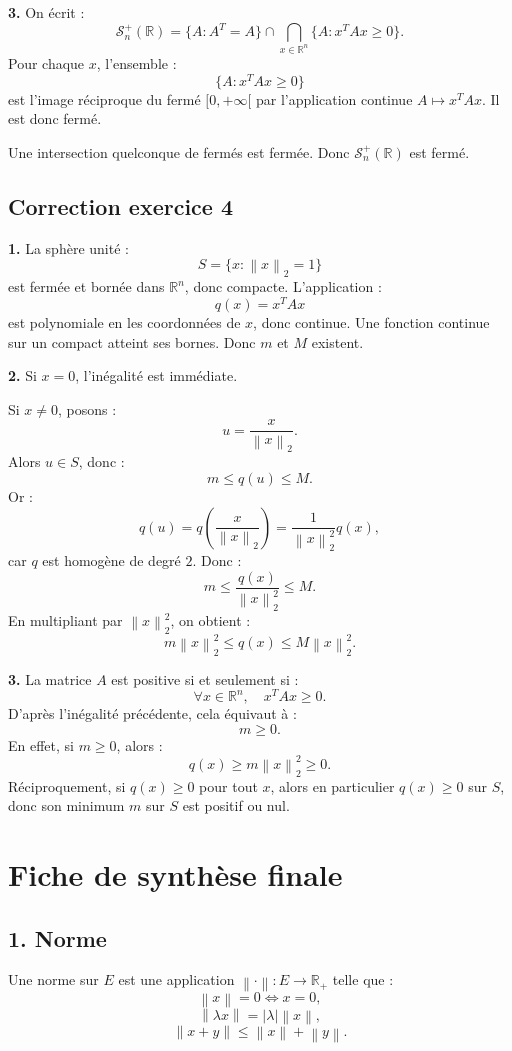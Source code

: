 \documentclass[11pt,a4paper]{article}
\newcommand{\R}{\mathbb R}
\newcommand{\norme}[1]{\left\lVert #1 \right\rVert}
\begin{document}
\textbf{3.}  
On écrit :
\[
\mathcal S_n^+(\R)
=
\{A:A^T=A\}\cap
\bigcap_{x\in\R^n}\{A:x^TAx\geq0\}.
\]
Pour chaque \(x\), l'ensemble :
\[
\{A:x^TAx\geq0\}
\]
est l'image réciproque du fermé \([0,+\infty[\) par l'application continue \(A\mapsto x^TAx\).  
Il est donc fermé.

Une intersection quelconque de fermés est fermée.  
Donc \(\mathcal S_n^+(\R)\) est fermé.

\subsection*{Correction exercice 4}

\textbf{1.}  
La sphère unité :
\[
S=\{x:\norme{x}_2=1\}
\]
est fermée et bornée dans \(\R^n\), donc compacte.  
L'application :
\[
q(x)=x^TAx
\]
est polynomiale en les coordonnées de \(x\), donc continue.  
Une fonction continue sur un compact atteint ses bornes.  
Donc \(m\) et \(M\) existent.

\textbf{2.}  
Si \(x=0\), l'inégalité est immédiate.

Si \(x\neq0\), posons :
\[
u=\frac{x}{\norme{x}_2}.
\]
Alors \(u\in S\), donc :
\[
m\leq q(u)\leq M.
\]
Or :
\[
q(u)
=
q\left(\frac{x}{\norme{x}_2}\right)
=
\frac{1}{\norme{x}_2^2}q(x),
\]
car \(q\) est homogène de degré \(2\).  
Donc :
\[
m\leq \frac{q(x)}{\norme{x}_2^2}\leq M.
\]
En multipliant par \(\norme{x}_2^2\), on obtient :
\[
m\norme{x}_2^2\leq q(x)\leq M\norme{x}_2^2.
\]

\textbf{3.}  
La matrice \(A\) est positive si et seulement si :
\[
\forall x\in\R^n,\quad x^TAx\geq0.
\]
D'après l'inégalité précédente, cela équivaut à :
\[
m\geq0.
\]
En effet, si \(m\geq0\), alors :
\[
q(x)\geq m\norme{x}_2^2\geq0.
\]
Réciproquement, si \(q(x)\geq0\) pour tout \(x\), alors en particulier \(q(x)\geq0\) sur \(S\), donc son minimum \(m\) sur \(S\) est positif ou nul.

\newpage
\section{Fiche de synthèse finale}

\subsection*{1. Norme}

Une norme sur \(E\) est une application \(\norme{\cdot}:E\to\R_+\) telle que :
\[
\norme{x}=0\Longleftrightarrow x=0,
\]
\[
\norme{\lambda x}=|\lambda|\norme{x},
\]
\[
\norme{x+y}\leq\norme{x}+\norme{y}.
\]
\end{document}

